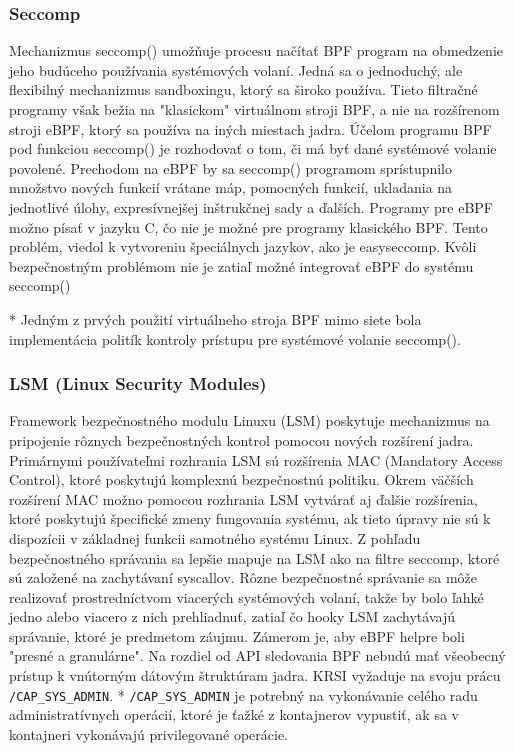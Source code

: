 \subsubsection{Seccomp}
Mechanizmus seccomp() umožňuje procesu načítať BPF program na obmedzenie jeho budúceho používania systémových volaní.
Jedná sa o jednoduchý, ale flexibilný mechanizmus sandboxingu, ktorý sa široko používa. 
Tieto filtračné programy však bežia na "klasickom" virtuálnom stroji BPF, a nie na rozšírenom stroji eBPF, ktorý sa používa na iných miestach jadra. 
Účelom programu BPF pod funkciou seccomp() je rozhodovať o tom, či má byť dané systémové volanie povolené.
Prechodom na eBPF by sa seccomp() programom sprístupnilo množstvo nových funkcií vrátane máp, pomocných funkcií, ukladania na jednotlivé úlohy, 
expresívnejšej inštrukčnej sady a ďalších. 
Programy pre eBPF možno písať v jazyku C, čo nie je možné pre programy klasického BPF. 
Tento problém, viedol k vytvoreniu špeciálnych jazykov, ako je easyseccomp. 
Kvôli bezpečnostným problémom nie je zatiaľ možné integrovať eBPF do systému seccomp()

* Jedným z prvých použití virtuálneho stroja BPF mimo siete bola implementácia politík kontroly prístupu pre systémové volanie seccomp().

\subsubsection{LSM (Linux Security Modules)}
Framework bezpečnostného modulu Linuxu (LSM) poskytuje mechanizmus na pripojenie rôznych bezpečnostných kontrol pomocou nových rozšírení jadra. 
Primárnymi používateľmi rozhrania LSM sú rozšírenia MAC (Mandatory Access Control), ktoré poskytujú komplexnú bezpečnostnú politiku. 
Okrem väčších rozšírení MAC možno pomocou rozhrania LSM vytvárať aj ďalšie rozšírenia, ktoré poskytujú špecifické zmeny fungovania systému, 
ak tieto úpravy nie sú k dispozícii v základnej funkcii samotného systému Linux. Z pohľadu bezpečnostného správania sa lepšie mapuje na LSM ako na 
filtre seccomp, ktoré sú založené na zachytávaní syscallov. Rôzne bezpečnostné správanie sa môže realizovať prostredníctvom viacerých systémových volaní, 
takže by bolo ľahké jedno alebo viacero z nich prehliadnuť, zatiaľ čo hooky LSM zachytávajú správanie, ktoré je predmetom záujmu. 
Zámerom je, aby eBPF helpre boli "presné a granulárne". Na rozdiel od API sledovania BPF nebudú mať všeobecný prístup k vnútorným dátovým štruktúram jadra. 
KRSI vyžaduje na svoju prácu \texttt{/CAP\_SYS\_ADMIN}.
* \texttt{/CAP\_SYS\_ADMIN} je potrebný na vykonávanie celého radu administratívnych operácií, ktoré je ťažké z kontajnerov vypustiť, 
ak sa v kontajneri vykonávajú privilegované operácie.

